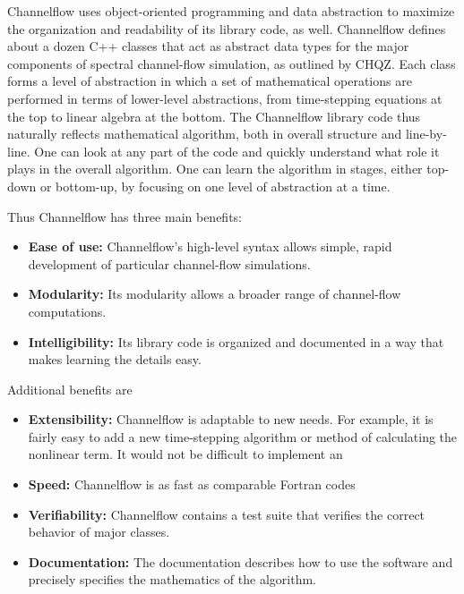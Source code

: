 \documentclass{article}[12pt]
\begin{document}
Channelflow uses object-oriented programming and data abstraction to
maximize the organization and readability of its library code, as
well. Channelflow defines about a dozen C++ classes that act as
abstract data types for the major components of spectral channel-flow
simulation, as outlined by CHQZ. Each class forms a level of
abstraction in which a set of mathematical operations are performed in
terms of lower-level abstractions, from time-stepping equations at the
top to linear algebra at the bottom. The Channelflow library code thus
naturally reflects mathematical algorithm, both in overall structure
and line-by-line. One can look at any part of the code and quickly
understand what role it plays in the overall algorithm. One can learn
the algorithm in stages, either top-down or bottom-up, by focusing
on one level of abstraction at a time.

Thus Channelflow has three main benefits:
\begin{itemize}
\item {\bf Ease of use:} Channelflow's high-level syntax allows
simple, rapid development of particular channel-flow simulations.
\item {\bf Modularity:} Its modularity allows a broader range of
channel-flow computations.
\item {\bf Intelligibility:} Its library code is organized and
documented in a way that makes learning the details easy.
\end{itemize}
Additional benefits are
\begin{itemize}
\item {\bf Extensibility:} Channelflow is adaptable to new needs. For
example, it is fairly easy to add a new time-stepping algorithm or
method of calculating the nonlinear term. It would not be difficult to
implement an
\item {\bf Speed:} Channelflow is as fast as comparable Fortran codes
\item {\bf Verifiability:} Channelflow contains a test suite
that verifies the correct behavior of major classes.
\item {\bf Documentation:} The documentation describes how to use
the software and precisely specifies the mathematics of the algorithm.
\end{itemize}


\end{document}
